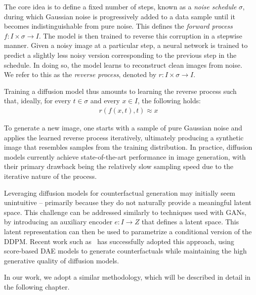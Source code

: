 The core idea is to define a fixed number of steps, known as a \emph{noise schedule} $\sigma$, during which Gaussian noise is progressively added to a data sample until it becomes indistinguishable from pure noise. This defines the \emph{forward process} $f : I \times \sigma \to I$. The model is then trained to reverse this corruption in a stepwise manner. Given a noisy image at a particular step, a neural network is trained to predict a slightly less noisy version corresponding to the previous step in the schedule. In doing so, the model learns to reconstruct clean images from noise. We refer to this as the \emph{reverse process}, denoted by $r : I \times \sigma \to I$.

Training a diffusion model thus amounts to learning the reverse process such that, ideally, for every $t \in \sigma$ and every $x \in I$, the following holds:
\begin{align*}
    r(f(x, t), t) \approx x
\end{align*}

To generate a new image, one starts with a sample of pure Gaussian noise and applies the learned reverse process iteratively, ultimately producing a synthetic image that resembles samples from the training distribution. In practice, diffusion models currently achieve state-of-the-art performance in image generation, with their primary drawback being the relatively slow sampling speed due to the iterative nature of the process.

Leveraging diffusion models for counterfactual generation may initially seem unintuitive -- primarily because they do not naturally provide a meaningful latent space. This challenge can be addressed similarly to techniques used with GANs, by introducing an auxiliary encoder $e : I \to Z$ that defines a latent space. This latent representation can then be used to parametrize a conditional version of the DDPM. Recent work such as~\cite{atad2024counterfactual,vzigutyte2025counterfactual} has successfully adopted this approach, using score-based DAE models to generate counterfactuals while maintaining the high generative quality of diffusion models.

In our work, we adopt a similar methodology, which will be described in detail in the following chapter.
